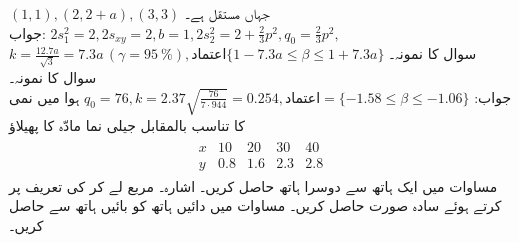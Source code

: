 \quad
$(1,1),(2,2+a),(3,3)$
جہاں  مستقل ہے۔\\
جواب:\quad
$2s_1^2=2, 2s_{xy}=2, b=1, 2s_2^2=2+\tfrac{2}{3}p^2,q_0=\tfrac{2}{3}p^2,$\\
$k=\tfrac{12.7a}{\sqrt{3}}=7.3a\, (\gamma=\SI{95}{\percent}), \text{اعتماد}\{1-7.3a\le \beta\le 1+7.3a\}$
\quad
سوال  کا نمونہ۔
\quad
سوال  کا نمونہ۔\\
جواب:\quad
$q_0=76,k=2.37\sqrt{\tfrac{76}{7\cdot 944}}=0.254, \text{اعتماد}=\{-1.58\le \beta\le -1.06\}$
\quad
ہوا میں نمی کا تناسب  بالمقابل جیلی نما مادّہ  کا پھیلاؤ 
\begin{align*}
\begin{array}{c|cccc}
x&10&20&30&40\\
\hline
y&0.8&1.6&2.3&2.8
\end{array}
\end{align*}
\quad
مساوات  میں ایک ہاتھ سے دوسرا ہاتھ حاصل کریں۔ اشارہ۔ مربع لے کر  کی تعریف پر کرتے ہوئے سادہ صورت حاصل کریں۔
\quad
مساوات  میں  دائیں ہاتھ کو بائیں ہاتھ سے حاصل کریں۔

